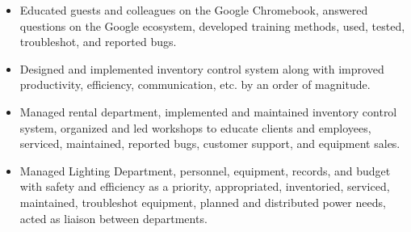 \documentclass[letterpaper]{article}        %
\begin{document}
    \begin{itemize}
    \item Educated guests and colleagues on the Google Chromebook, answered questions on the Google ecosystem, developed training methods, used, tested, troubleshot, and reported bugs.
    \end{itemize}
  
    \begin{itemize}
    \item Designed and implemented inventory control system along with improved productivity, efficiency, communication, etc. by an order of magnitude.
    \end{itemize}
  
    \begin{itemize}
    \item Managed rental department, implemented and maintained inventory control system, organized and led workshops to educate clients and employees, serviced, maintained, reported bugs, customer support, and equipment sales.
    \end{itemize}
  
    \begin{itemize}
    \item Managed Lighting Department, personnel, equipment, records, and budget with safety and efficiency as a priority, appropriated, inventoried, serviced, maintained, troubleshot equipment, planned and distributed power needs, acted as liaison between departments.
    \end{itemize}

\end{document}
